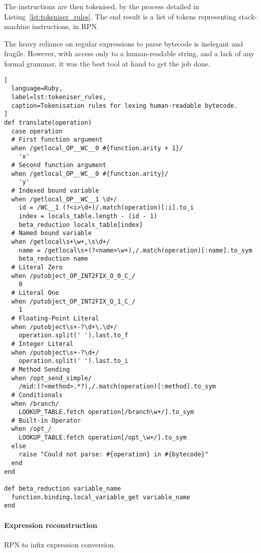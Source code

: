 The instructions are then tokenised, by the process detailed in Listing~\ref{lst:tokeniser_rules}.
The end result is a list of tokens representing stack-machine instructions, in \ac{RPN}.

The heavy reliance on regular expressions to parse bytecode is inelegant and fragile.
However, with access only to a human-readable string, and a lack of any formal grammar, it was the best tool at hand to get the job done.

\begin{lstlisting}[
  language=Ruby,
  label=lst:tokeniser_rules,
  caption=Tokenisation rules for lexing human-readable bytecode.
]
def translate(operation)
  case operation
  # First function argument
  when /getlocal_OP__WC__0 #{function.arity + 1}/
    'x'
  # Second function argument
  when /getlocal_OP__WC__0 #{function.arity}/
    'y'
  # Indexed bound variable
  when /getlocal_OP__WC__1 \d+/
    id = /WC__1 (?<i>\d+)/.match(operation)[:i].to_i
    index = locals_table.length - (id - 1)
    beta_reduction locals_table[index]
  # Named bound variable
  when /getlocal\s+\w+,\s\d+/
    name = /getlocal\s+(?<name>\w+),/.match(operation)[:name].to_sym
    beta_reduction name
  # Literal Zero
  when /putobject_OP_INT2FIX_O_0_C_/
    0
  # Literal One
  when /putobject_OP_INT2FIX_O_1_C_/
    1
  # Floating-Point Literal
  when /putobject\s+-?\d+\.\d+/
    operation.split(' ').last.to_f
  # Integer Literal
  when /putobject\s+-?\d+/
    operation.split(' ').last.to_i
  # Method Sending
  when /opt_send_simple/
    /mid:(?<method>.*?),/.match(operation)[:method].to_sym
  # Conditionals
  when /branch/
    LOOKUP_TABLE.fetch operation[/branch\w+/].to_sym
  # Built-in Operator
  when /opt_/
    LOOKUP_TABLE.fetch operation[/opt_\w+/].to_sym
  else
    raise "Could not parse: #{operation} in #{bytecode}"
  end
end

def beta_reduction variable_name
  function.binding.local_variable_get variable_name
end
\end{lstlisting}

\paragraph*{Expression reconstruction}

\begin{algorithm}[h]
  \caption{\ac{RPN} to infix expression conversion.}
  \label{alg:to_infix}

  \begin{algorithmic}
    \Else
    \EndIf
    \EndWhile
    \EndFunction
  \end{algorithmic}
\end{algorithm}

